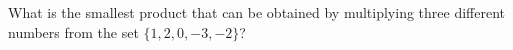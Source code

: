 What is the smallest product that can be obtained by multiplying three different numbers from the set $\{1,2,0,-3,-2\}$?
